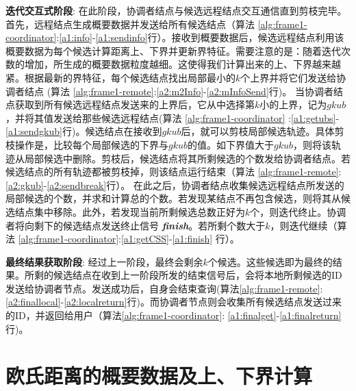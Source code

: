 \textbf{迭代交互式阶段}:  在此阶段，协调者结点与候选远程结点交互通信直到剪枝完毕。 首先，远程结点生成概要数据并发送给所有候选结点（算法 \ref{alg:frame1-coordinator}:\ref{a1:info}-\ref{a1:sendinfo}行）。接收到概要数据后，候选远程结点利用该概要数据为每个候选计算距离上、下界并更新界特征。需要注意的是：随着迭代次数的增加，所生成的概要数据粒度越细。这使得我们计算出来的上、下界越来越紧。根据最新的界特征，每个候选结点找出局部最小的$k$个上界并将它们发送给协调者结点 (算法 \ref{alg:frame1-remote}:\ref{a2:m2Info}-\ref{a2:mInfoSend}行)。
当协调者结点获取到所有候选远程结点发送来的上界后，它从中选择第$k$小的上界，记为$gkub$，并将其值发送给那些候选远程结点(算法 \ref{alg:frame1-coordinator} :\ref{a1:getubs}-\ref{a1:sendgkub}行)。候选结点在接收到$gkub$后，就可以剪枝局部候选轨迹。具体剪枝操作是，比较每个局部候选的下界与$gkub$的值。如下界值大于$gkub$，则将该轨迹从局部候选中删除。剪枝后，候选结点将其所剩候选的个数发给协调者结点。若候选结点的所有轨迹都被剪枝掉，则该结点运行结束（算法 \ref{alg:frame1-remote}:\ref{a2:gkub}-\ref{a2:sendbreak}行）。 在此之后，协调者结点收集候选远程结点所发送的局部候选的个数，并求和计算总的个数。若发现某结点不再包含候选，则将其从候选结点集中移除。此外，若发现当前所剩候选总数正好为$k$个，则迭代终止。协调者将向剩下的候选结点发送终止信号 \emph{\textbf{finish}}。若所剩个数大于$k$，则迭代继续（算法 \ref{alg:frame1-coordinator}:\ref{a1:getCSS}-\ref{a1:finish} 行）。

\textbf{最终结果获取阶段}: 经过上一阶段，最终会剩余$k$个候选。这些候选即为最终的结果。所剩的候选结点在收到上一阶段所发的结束信号后，会将本地所剩候选的ID发送给协调者节点。发送成功后，自身会结束查询(算法\ref{alg:frame1-remote}: \ref{a2:finallocal}-\ref{a2:localreturn}行)。而协调者节点则会收集所有候选结点发送过来的ID，并返回给用户（算法\ref{alg:frame1-coordinator}: \ref{a1:finalget}-\ref{a1:finalreturn}行)。



\section{欧氏距离的概要数据及上、下界计算}\label{sec-c4-EDsummary}
